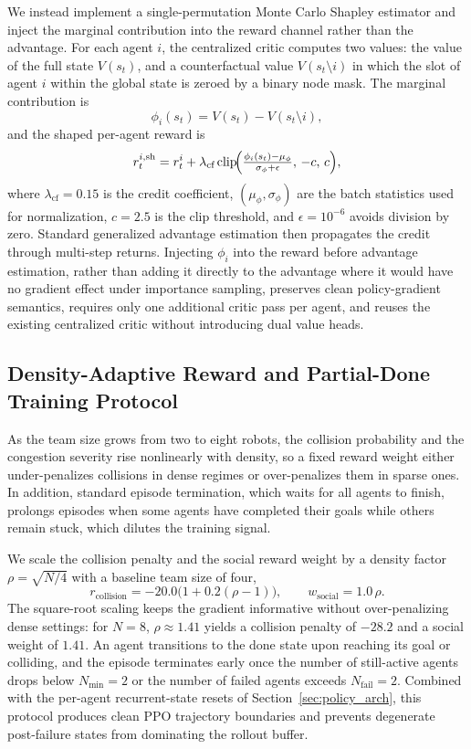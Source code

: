 \documentclass[journal,twoside,web]{ieeecolor}
\begin{document}
We instead implement a single-permutation Monte Carlo Shapley estimator and inject the marginal contribution into the reward channel rather than the advantage. For each agent $i$, the centralized critic computes two values: the value of the full state $V(s_t)$, and a counterfactual value $V(s_t\setminus i)$ in which the slot of agent $i$ within the global state is zeroed by a binary node mask. The marginal contribution is
\[
\phi_i(s_t) = V(s_t) - V(s_t\setminus i),
\]
and the shaped per-agent reward is
\[
r_t^{i,\text{sh}} = r_t^i + \lambda_{\text{cf}}\,\mathrm{clip}\!\Bigl(\tfrac{\phi_i(s_t)-\mu_\phi}{\sigma_\phi+\epsilon},\,-c,\,c\Bigr),
\]
where $\lambda_{\text{cf}}=0.15$ is the credit coefficient, $(\mu_\phi,\sigma_\phi)$ are the batch statistics used for normalization, $c=2.5$ is the clip threshold, and $\epsilon=10^{-6}$ avoids division by zero. Standard generalized advantage estimation then propagates the credit through multi-step returns. Injecting $\phi_i$ into the reward before advantage estimation, rather than adding it directly to the advantage where it would have no gradient effect under importance sampling, preserves clean policy-gradient semantics, requires only one additional critic pass per agent, and reuses the existing centralized critic without introducing dual value heads.

\subsection{Density-Adaptive Reward and Partial-Done Training Protocol}
\label{sec:training_protocol}

As the team size grows from two to eight robots, the collision probability and the congestion severity rise nonlinearly with density, so a fixed reward weight either under-penalizes collisions in dense regimes or over-penalizes them in sparse ones. In addition, standard episode termination, which waits for all agents to finish, prolongs episodes when some agents have completed their goals while others remain stuck, which dilutes the training signal.

We scale the collision penalty and the social reward weight by a density factor $\rho=\sqrt{N/4}$ with a baseline team size of four,
\[
r_{\text{collision}} = -20.0\bigl(1+0.2(\rho-1)\bigr),\qquad w_{\text{social}} = 1.0\,\rho.
\]
The square-root scaling keeps the gradient informative without over-penalizing dense settings: for $N=8$, $\rho\approx 1.41$ yields a collision penalty of $-28.2$ and a social weight of $1.41$. An agent transitions to the done state upon reaching its goal or colliding, and the episode terminates early once the number of still-active agents drops below $N_{\min}=2$ or the number of failed agents exceeds $N_{\text{fail}}=2$. Combined with the per-agent recurrent-state resets of Section~\ref{sec:policy_arch}, this protocol produces clean PPO trajectory boundaries and prevents degenerate post-failure states from dominating the rollout buffer.
\end{document}
